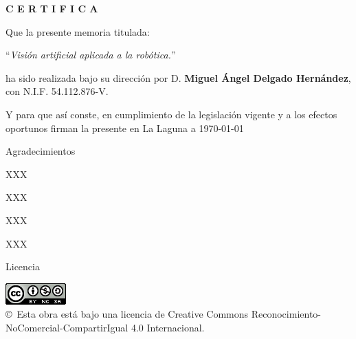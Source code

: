 \documentclass[spanish,a4paper,14pt,oneside]{extreport}
\begin{document}
\bigskip
\bigskip
{\bf C E R T I F I C A}

\bigskip
\bigskip
\bigskip
Que la presente memoria titulada:

\bigskip
``{\it Visión artificial aplicada a la robótica.}''

\bigskip
\bigskip
\bigskip

\noindent ha sido realizada bajo su dirección por D. {\bf Miguel Ángel Delgado Hernández},
con N.I.F. 54.112.876-V.

\bigskip
\bigskip

Y para que así conste, en cumplimiento de la legislación vigente y a los efectos
oportunos firman la presente en La Laguna a \today

\newpage
\thispagestyle{empty}

{ \flushright

\begin{LARGE}
Agradecimientos
\end{LARGE}

\hspace{3mm}

\begin{large}


\hspace{3mm}
XXX

\hspace{3mm}
XXX


\hspace{3mm}
XXX


\hspace{3mm}
XXX


\end{large}

}

\newpage

\begin{huge}
Licencia
\end{huge}

\begin{center}
\includegraphics[scale=1.5]{images/by-nc-sa_88x31}\\[10mm]
{\Large \copyright~Esta obra está bajo una licencia de Creative Commons Reconocimiento-NoComercial-CompartirIgual 4.0 Internacional.
}
\end{center}
\end{document}
